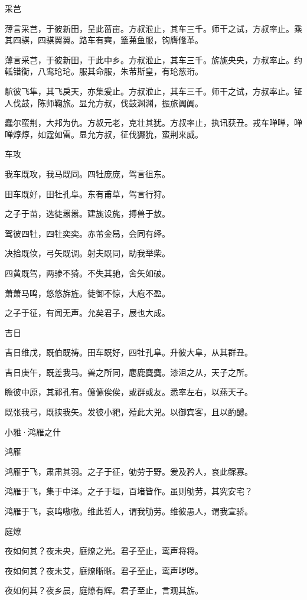 采芑

薄言采芑，于彼新田，呈此菑亩。方叔涖止，其车三千。师干之试，方叔率止。乘其四骐，四骐翼翼。路车有奭，簟茀鱼服，钩膺鞗革。

薄言采芑，于彼新田，于此中乡。方叔涖止，其车三千。旂旐央央，方叔率止。约軧错衡，八鸾玱玱。服其命服，朱芾斯皇，有玱葱珩。

鴥彼飞隼，其飞戾天，亦集爰止。方叔涖止，其车三千。师干之试，方叔率止。钲人伐鼓，陈师鞠旅。显允方叔，伐鼓渊渊，振旅阗阗。

蠢尔蛮荆，大邦为仇。方叔元老，克壮其犹。方叔率止，执讯获丑。戎车啴啴，啴啴焞焞，如霆如雷。显允方叔，征伐玁狁，蛮荆来威。

车攻

我车既攻，我马既同。四牡庞庞，驾言徂东。

田车既好，田牡孔阜。东有甫草，驾言行狩。

之子于苗，选徒嚣嚣。建旐设旄，搏兽于敖。

驾彼四牡，四牡奕奕。赤芾金舄，会同有绎。

决拾既佽，弓矢既调。射夫既同，助我举柴。

四黄既驾，两骖不猗。不失其驰，舍矢如破。

萧萧马鸣，悠悠旆旌。徒御不惊，大庖不盈。

之子于征，有闻无声。允矣君子，展也大成。

吉日

吉日维戊，既伯既祷。田车既好，四牡孔阜。升彼大阜，从其群丑。

吉日庚午，既差我马。兽之所同，麀鹿麌麌。漆沮之从，天子之所。

瞻彼中原，其祁孔有。儦儦俟俟，或群或友。悉率左右，以燕天子。

既张我弓，既挟我矢。发彼小豝，殪此大兕。以御宾客，且以酌醴。




小雅·鸿雁之什


鸿雁

鸿雁于飞，肃肃其羽。之子于征，劬劳于野。爰及矜人，哀此鳏寡。

鸿雁于飞，集于中泽。之子于垣，百堵皆作。虽则劬劳，其究安宅？

鸿雁于飞，哀鸣嗷嗷。维此哲人，谓我劬劳。维彼愚人，谓我宣骄。

庭燎

夜如何其？夜未央，庭燎之光。君子至止，鸾声将将。

夜如何其？夜未艾，庭燎晣晣。君子至止，鸾声哕哕。

夜如何其？夜乡晨，庭燎有辉。君子至止，言观其旂。

